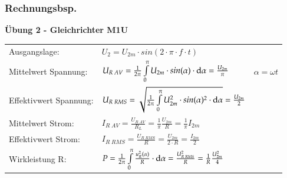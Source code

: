 \subsubsection{Rechnungsbsp.}
\textbf{Übung 2 - Gleichrichter M1U}\newline
\renewcommand{\arraystretch}{2}
\begin{tabular}{ p{}  p{}  p{}}
    Ausgangslage:&
    $ U_2= U_{2m}\cdot sin(2\cdot \pi\cdot f\cdot t)$&
    \\
    Mittelwert Spannung: &
    $ U_{R \; AV}= \frac{1}{2 \pi} \int\limits_{0}^{\pi} U_{2m}\cdot sin(\alpha)\cdot\mathop{}\!\mathrm{d}\alpha=\frac{U_{2m}}{\pi} $ &
    $ \alpha=\omega t $
    \\
    
    Effektivwert Spannung:   &
    $ U_{R \; RMS}= \sqrt{\frac{1}{2 \pi}\int\limits_{0}^{\pi} U_{2m}^2\cdot sin(\alpha)^2\cdot\mathop{}\!\mathrm{d}\alpha} = \frac{U_{2m}}{2} $ &
    \\ 
    
    Mittelwert Strom: &
    $ I_{R \; AV}=\frac{U_{R \; AV}}{R_L}= \frac{1}{\pi}\frac{U_{2m}}{R}= \frac{1}{\pi} I_{2m} $ &
    \\
    
    Effektivwert Strom: &
    $ I_{R \; RMS}=\frac{U_{R \; RMS}}{R}= \frac{U_{2m}}{2\cdot R}= \frac{I_{2m}}{2} $ &
    \\
    
    Wirkleistung R: &
    $ P= \frac{1}{2\pi}\int\limits_{0}^{\pi}\frac{u_R^2(\alpha)}{R}\cdot \mathop{}\!\mathrm{d} \alpha = \frac{U_{R \; RMS}^2}{R}=\frac{1}{R}\frac{U_{2m}^2}{4} $
\end{tabular}
\renewcommand{\arraystretch}{1}

\clearpage

